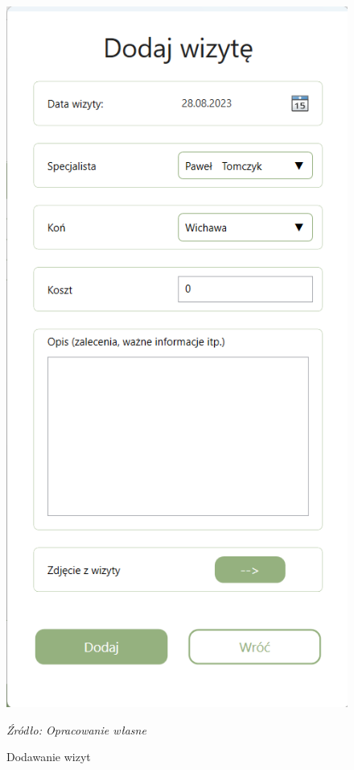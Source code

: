 \documentclass[12pt,oneside]{report}
\begin{document}
\begin{figure}
\begin{center}
\begin{minipage}{6cm}
			\includegraphics[scale=0.4]{dodajWizyte}
			\caption{Dodawanie wizyt}
			\textit{Źródło: Opracowanie własne}
			\label{DodajWizyty}
		\end{minipage}
	\end{center}
\end{figure}
\end{document}
